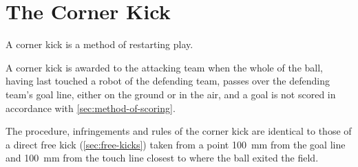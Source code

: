 \section{The Corner Kick}\label{sec:corner-kick}

A corner kick is a method of restarting play.

A corner kick is awarded to the attacking team when the whole of the ball, having last touched a
robot of the defending team, passes over the defending team's goal line, either on the ground or
in the air, and a goal is not scored in accordance with \autoref{sec:method-of-scoring}.

The procedure, infringements and rules of the corner kick are identical to those of a direct free
kick (\autoref{sec:free-kicks}) taken from a point 100 \,mm from the goal line and 100 \,mm
from the touch line closest to where the ball exited the field.
